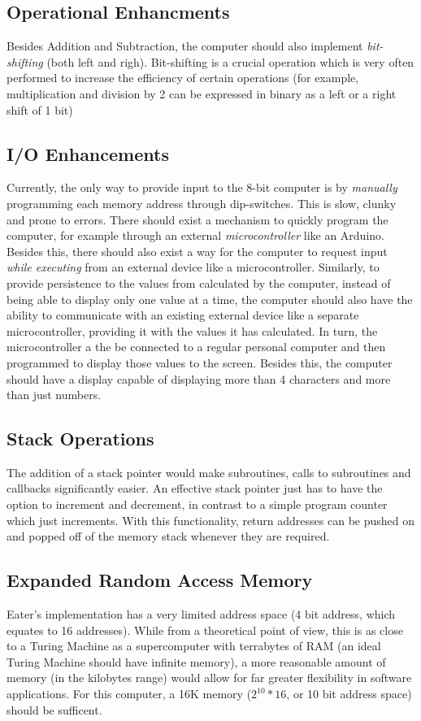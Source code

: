 \subsection{Operational Enhancments}
Besides Addition and Subtraction, the computer should also implement \emph{bit-shifting} (both left and righ). Bit-shifting is a crucial operation which is very often performed to increase the efficiency of certain operations (for example, multiplication and division by 2 can be expressed in binary as a left or a right shift of 1 bit)

\subsection{I/O Enhancements}
Currently, the only way to provide input to the 8-bit computer is by \emph{manually} programming each memory address through dip-switches. This is slow, clunky and prone to errors. There should exist a mechanism to quickly program the computer, for example through an external \emph{microcontroller} like an Arduino. Besides this, there should also exist a way for the computer to request input \emph{while executing} from an external device like a microcontroller.
Similarly, to provide persistence to the values from calculated by the computer, instead of being able to display only one value at a time, the computer should also have the ability to communicate with an existing external device like a separate microcontroller, providing it with the values it has calculated. In turn, the microcontroller a the be connected to a regular personal computer and then programmed to display those values to the screen. Besides this, the computer should have a display capable of displaying
more than 4 characters and more than just numbers.

\subsection{Stack Operations}
The addition of a stack pointer would make subroutines, calls to subroutines and callbacks significantly easier. An effective
stack pointer just has to have the option to increment and decrement, in contrast to a simple program counter which just increments.
With this functionality, return addresses can be pushed on and popped off of the memory stack whenever they are required.

\subsection{Expanded Random Access Memory}
Eater's implementation has a very limited address space (4 bit address, which equates to 16 addresses). While from a theoretical
point of view, this is as close to a Turing Machine as a supercomputer with terrabytes of RAM (an ideal Turing Machine should have infinite memory), a more reasonable amount of memory (in the kilobytes range) would allow for far greater flexibility in software
applications. For this computer, a 16K memory (\(2^{10} * 16\), or 10 bit address space) should be sufficent.

